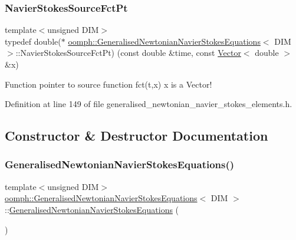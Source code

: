 \subsubsection{\texorpdfstring{Navier\+Stokes\+Source\+Fct\+Pt}{NavierStokesSourceFctPt}}
{\footnotesize\ttfamily template$<$unsigned D\+IM$>$ \\
typedef double($\ast$ \hyperlink{classoomph_1_1GeneralisedNewtonianNavierStokesEquations}{oomph\+::\+Generalised\+Newtonian\+Navier\+Stokes\+Equations}$<$ D\+IM $>$\+::Navier\+Stokes\+Source\+Fct\+Pt) (const double \&time, const \hyperlink{classoomph_1_1Vector}{Vector}$<$ double $>$ \&x)}



Function pointer to source function fct(t,x) x is a Vector! 



Definition at line 149 of file generalised\+\_\+newtonian\+\_\+navier\+\_\+stokes\+\_\+elements.\+h.



\subsection{Constructor \& Destructor Documentation}
\mbox{\label{classoomph_1_1GeneralisedNewtonianNavierStokesEquations_a90c3261233223113f6a4365acf1a7ee8}} 
\subsubsection{\texorpdfstring{Generalised\+Newtonian\+Navier\+Stokes\+Equations()}{GeneralisedNewtonianNavierStokesEquations()}}
{\footnotesize\ttfamily template$<$unsigned D\+IM$>$ \\
\hyperlink{classoomph_1_1GeneralisedNewtonianNavierStokesEquations}{oomph\+::\+Generalised\+Newtonian\+Navier\+Stokes\+Equations}$<$ D\+IM $>$\+::\hyperlink{classoomph_1_1GeneralisedNewtonianNavierStokesEquations}{Generalised\+Newtonian\+Navier\+Stokes\+Equations} (\begin{DoxyParamCaption}{ }\end{DoxyParamCaption})\hspace{0.3cm}{\ttfamily [inline]}}



